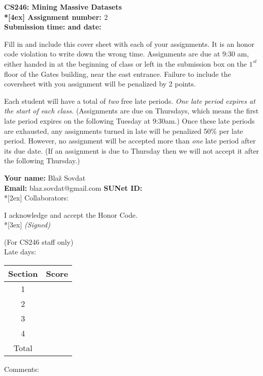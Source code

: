 \begin{titlepage}
	\thispagestyle{empty}
	\parindent 0pt
	\vfill

	\begin{center}
	\LARGE{\bf \textsf{CS246: Mining Massive Datasets} \\*[4ex]
	\Large{
	Assignment number: $2$\hrulefill \\
	Submission time: \hrulefill \quad and date: \hrulefill } }
	\end{center}

	\vfill

	Fill in and include this cover sheet with each of your assignments. It is an honor code violation to write down the wrong time. Assignments are due at 9:30 am, either handed in at the beginning of class or left in the submission box on the $1^{st}$ floor of the Gates building, near the east entrance. Failure to include the coversheet with you assignment will be penalized by 2 points.

	Each student will have a total of {\em two} free late periods. {\em One late period expires at the start of each class.} (Assignments are due on Thursdays, which means the first late period expires on the following Tuesday at 9:30am.) Once these late periods are exhausted, any assignments turned in late will be penalized 50\% per late period. However, no assignment will be accepted more than {\em one} late period after its due date. (If an assignment is due to Thursday then we will not accept it after the following Thursday.) 

	\vfill
	\bigskip
	\vfill

	{\Large
	\textbf{Your name:} Bla\v{z} Sovdat\hrulefill \\
	\textbf{Email:} blaz.sovdat@gmail.com\underline{\hspace*{7cm}} \textbf{SUNet ID:} \hrulefill\\*[2ex] }
	Collaborators:\hrulefill
	\vfill

	I acknowledge and accept the Honor Code.\\*[3ex]
	\bigskip
	\textit{(Signed)}\hrulefill

	\vfill
	\vfill

	\begin{center}
	\normalsize{(For CS246 staff only)\\
	\bigskip
	Late days:  }
	\end{center}


	\begin{center}
	\linespread{1.3}
	\large
	\begin{tabular}{|c|r|}\hline
	Section & \hspace*{1.5cm} Score \\ \hline \hline
	1 &  \\ \hline
	2 &  \\ \hline
	3 &  \\ \hline
	4 &  \\ \hline
	\hline
	Total & \hspace*{1cm} \\ \hline
	\end{tabular}
	\end{center}
	Comments:
\end{titlepage}
